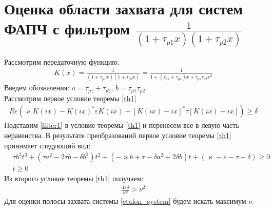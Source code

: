 \documentclass[a4paper,14pt]{extarticle} %
\begin{document}
\section{Оценка области захвата для систем ФАПЧ с фильтром $\frac{1}{(1+\tau_{p1}x)(1+\tau_{p2}x)}$}
 Рассмотрим передаточную функцию:
 \begin{equation}\label{filter1}
 \begin{aligned}
K(x) = \frac{1}{(1+\tau_{p1}x)(1+\tau_{p2}x)} = \frac{1}{1+(\tau_{p1}+\tau_{p2})x + \tau_{p1}\tau_{p2}x^2}
 \end{aligned}
\end{equation}
Введем обозначения: $a = \tau_{p1}+\tau_{p2}$, $b = \tau_{p1}\tau_{p2}$\\
Рассмотрим первое условие теоремы \ref{th1}
\begin{equation}
 \begin{aligned}
Re(\varkappa K(ix)-K(ix)^*\varepsilon K(ix)-[K(ix)-ix]^*\tau[K(ix)+ix])\geq\delta
 \end{aligned}
\end{equation}
Подставим \eqref{filter1} в условие теоремы \ref{th1} и перенесем все в левую часть неравенства. В результате преобразований первое условие теоремы \ref{th1} принимает следующий вид:
\begin{equation}\label{first_condition}
 \begin{aligned}
&\tau b^2t^3 + (\tau a^2-2 \tau b - \delta b^2)t^2 + (-\varkappa b+\tau-\delta a^2 + 2\delta b)t + (\varkappa-\varepsilon-\tau-\delta) \geq 0\\
&t \geq 0
 \end{aligned}
\end{equation}
Из второго условие теоремы \ref{th1} получаем: 
\begin{equation}
 \begin{aligned}
\frac{4\varepsilon\delta}{\varkappa^2} > \nu^2
 \end{aligned}
\end{equation}
Для оценки полосы захвата системы \eqref{etalon_system} будем искать максимум $\nu$.
\end{document}

